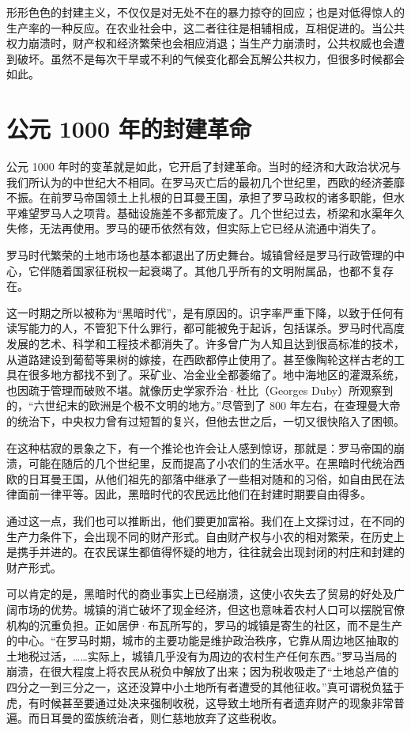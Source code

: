 形形色色的封建主义，不仅仅是对无处不在的暴力掠夺的回应；也是对低得惊人的生产率的一种反应。在农业社会中，这二者往往是相辅相成，互相促进的。当公共权力崩溃时，财产权和经济繁荣也会相应消退；当生产力崩溃时，公共权威也会遭到破坏。虽然不是每次干旱或不利的气候变化都会瓦解公共权力，但很多时候都会如此。

\section{公元 1000 年的封建革命}
公元 1000 年时的变革就是如此，它开启了封建革命。当时的经济和大政治状况与我们所认为的中世纪大不相同。在罗马灭亡后的最初几个世纪里，西欧的经济萎靡不振。在前罗马帝国领土上扎根的日耳曼王国，承担了罗马政权的诸多职能，但水平难望罗马人之项背。基础设施差不多都荒废了。几个世纪过去，桥梁和水渠年久失修，无法再使用。罗马的硬币依然有效，但实际上它已经从流通中消失了。

罗马时代繁荣的土地市场也基本都退出了历史舞台。城镇曾经是罗马行政管理的中心，它伴随着国家征税权一起衰竭了。其他几乎所有的文明附属品，也都不复存在。

这一时期之所以被称为“黑暗时代”，是有原因的。识字率严重下降，以致于任何有读写能力的人，不管犯下什么罪行，都可能被免于起诉，包括谋杀。罗马时代高度发展的艺术、科学和工程技术都消失了。许多曾广为人知且达到很高标准的技术，从道路建设到葡萄等果树的嫁接，在西欧都停止使用了。甚至像陶轮这样古老的工具在很多地方都找不到了。采矿业、冶金业全都萎缩了。地中海地区的灌溉系统，也因疏于管理而破败不堪。就像历史学家乔治·杜比（Georges Duby）所观察到的，“六世纪末的欧洲是个极不文明的地方。”尽管到了 800 年左右，在查理曼大帝的统治下，中央权力曾有过短暂的复兴，但他去世之后，一切又很快陷入了困顿。

在这种枯寂的景象之下，有一个推论也许会让人感到惊讶，那就是：罗马帝国的崩溃，可能在随后的几个世纪里，反而提高了小农们的生活水平。在黑暗时代统治西欧的日耳曼王国，从他们祖先的部落中继承了一些相对随和的习俗，如自由民在法律面前一律平等。因此，黑暗时代的农民远比他们在封建时期要自由得多。

通过这一点，我们也可以推断出，他们要更加富裕。我们在上文探讨过，在不同的生产力条件下，会出现不同的财产形式。自由财产权与小农的相对繁荣，在历史上是携手并进的。在农民谋生都值得怀疑的地方，往往就会出现封闭的村庄和封建的财产形式。

可以肯定的是，黑暗时代的商业事实上已经崩溃，这使小农失去了贸易的好处及广阔市场的优势。城镇的消亡破坏了现金经济，但这也意味着农村人口可以摆脱官僚机构的沉重负担。正如居伊·布瓦所写的，罗马的城镇是寄生的社区，而不是生产的中心。“在罗马时期，城市的主要功能是维护政治秩序，它靠从周边地区抽取的土地税过活，……实际上，城镇几乎没有为周边的农村生产任何东西。”罗马当局的崩溃，在很大程度上将农民从税负中解放了出来；因为税收吸走了“土地总产值的四分之一到三分之一，这还没算中小土地所有者遭受的其他征收。”真可谓税负猛于虎，有时候甚至要通过处决来强制收税，这导致土地所有者遗弃财产的现象非常普遍。而日耳曼的蛮族统治者，则仁慈地放弃了这些税收。


